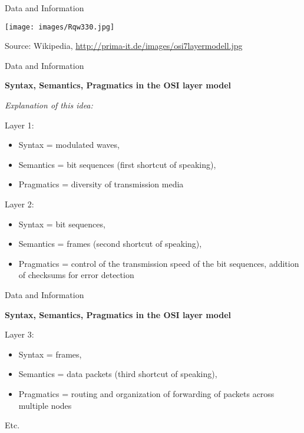 \documentclass{beamer}
\newcommand{\ueberschrift}[1]{\begin{center}\bf #1\end{center}}
\begin{document}
\begin{frame}{Data and Information}
  \begin{center}
    \texttt{[image: images/Rqw330.jpg]}
  \end{center}
Source: Wikipedia, \url{http://prima-it.de/images/osi7layermodell.jpg}
\end{frame}
\begin{frame}{Data and Information}

  \ueberschrift{Syntax, Semantics, Pragmatics in the OSI layer model}

\emph{Explanation of this idea:}

Layer 1: 
\begin{itemize}
\item Syntax = modulated waves,
\item Semantics = bit sequences (first shortcut of speaking), 
\item Pragmatics = diversity of transmission media
\end{itemize}
Layer 2: 
\begin{itemize}
\item Syntax = bit sequences, 
\item Semantics = frames (second shortcut of speaking),
\item Pragmatics = control of the transmission speed of the bit sequences,
  addition of checksums for error detection
\end{itemize}\vspace*{2em}
\end{frame}
\begin{frame}{Data and Information}

  \ueberschrift{Syntax, Semantics, Pragmatics in the OSI layer model}

Layer 3: 
\begin{itemize}
\item Syntax = frames, 
\item Semantics = data packets (third shortcut of speaking),
\item Pragmatics = routing and organization of forwarding of packets across
  multiple nodes
\end{itemize}
Etc.\vfill
\end{frame}
\end{document}
